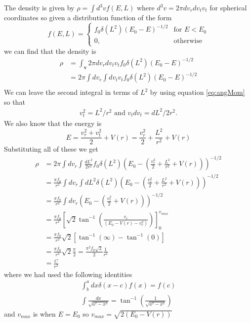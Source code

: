 The density is given by $\rho=\int d^3v f(E,L)$ where $d^3v=2\pi dv_r dv_t v_t$ for spherical coordinates so given a distribution function of the form
\begin{equation}
    f(E,L) = \left\{\begin{array}{lr}
        f_0\delta(L^2)(E_0-E)^{-1/2} & \text{for } E< E_0\\
        0, & \text{otherwise }
        \end{array}\right.
\end{equation}
we can find that the density is
\begin{align*}
    \rho &=\int_\mathbf{v} 2\pi dv_r dv_t v_t f_0\delta(L^2)(E_0-E)^{-1/2}\\
    &= 2\pi \int dv_r \int dv_t v_t f_0\delta(L^2)(E_0-E)^{-1/2}\\
\end{align*}
We can leave the second integral in terms of $L^2$ by using equation \ref{eq:angMom} so that
\begin{align*}
    v_t^2=L^2/r^2 \text{ and } v_tdv_t=dL^2/2r^2.
\end{align*}
We also know that the energy is
\begin{equation}
    E=\frac{v_r^2+v_t^2}{2}+V(r)=\frac{v_r^2}{2}+\frac{L^2}{r^2} + V(r)
\end{equation}
Substituting all of these we get 
\begin{align*}
    \rho & = 2\pi \int dv_r \int \frac{dL^2}{2r^2} f_0 \delta(L^2) (E_0 - \left(\frac{v_r^2}{2}+\frac{L^2}{r^2} + V(r)\right))^{-1/2}\\
    &= \frac{\pi f_0}{r^2}\int dv_r \int dL^2 \delta(L^2) (E_0 - \left(\frac{v_r^2}{2}+\frac{L^2}{r^2} + V(r)\right))^{-1/2}\\
    &= \frac{\pi f_0}{r^2}\int dv_r \left(E_0 - \left(\frac{v_r^2}{2} + V(r)\right)\right)^{-1/2}\\
    &= \frac{\pi f_0}{r^2} \left[ \sqrt{2} \tan^{-1}\left( \frac{v_r}{(E_0-V(r)-v^2_r)}\right)\right]^{v_{max}}_0\\
    &= \frac{\pi f_0}{r^2}\sqrt{2}\left[ \tan^{-1}\left(\infty\right) - \tan^{-1}\left(0\right)\right]\\
    &= \frac{\pi f_0}{r^2}\sqrt{2}\frac{\pi}{2}=\frac{\pi^2f_0\sqrt{2}}{2}\frac{1}{r^2}\\
    &= \frac{C}{r^2}
\end{align*}
where we had used the following identities
\begin{align}
    \int^a_b dx \delta(x-c)f(x)=f(c)\\
    \int\frac{dx}{\sqrt{a^2-x^2}}=\tan^{-1}\left(\frac{1}{\sqrt{a^2-x^2}}\right)
\end{align}
and $v_{max}$ is when $E=E_0$ so $v_{max}=\sqrt{2(E_0-V(r))}$



